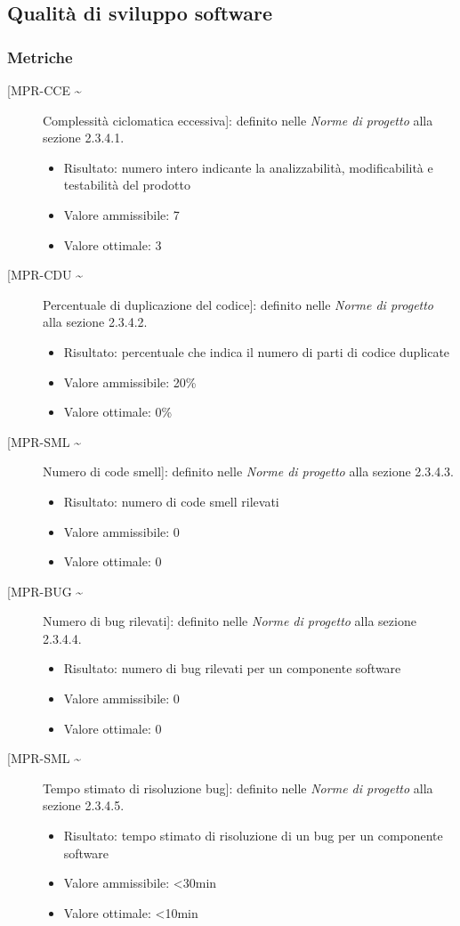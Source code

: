 \documentclass[../piano-di-qualifica.tex]{subfiles}
\begin{document}
\subsection{Qualità di sviluppo software}


\subsubsection{Metriche}%
\label{subsec:metriche_doc}

\begin{description}
  \item [[MPR-CCE \textasciitilde] Complessità ciclomatica eccessiva]: definito nelle \textit{Norme di progetto} alla sezione 2.3.4.1.
        \begin{itemize} \item Risultato: numero intero indicante la analizzabilità, modificabilità e testabilità del prodotto \item Valore ammissibile: \leq{}  7  \item Valore ottimale: \leq{}  3 \end{itemize}
  \item [[MPR-CDU \textasciitilde] Percentuale di duplicazione del codice]: definito nelle \textit{Norme di progetto} alla sezione 2.3.4.2.
        \begin{itemize} \item Risultato: percentuale che indica il numero di parti di codice duplicate \item Valore ammissibile: 20\% \item Valore ottimale: 0\% \end{itemize}
  \item [[MPR-SML \textasciitilde] Numero di code smell]: definito nelle \textit{Norme di progetto} alla sezione 2.3.4.3.
        \begin{itemize} \item Risultato: numero di code smell rilevati \item Valore ammissibile: 0 \item Valore ottimale: 0 \end{itemize}
  \item [[MPR-BUG \textasciitilde] Numero di bug rilevati]: definito nelle \textit{Norme di progetto} alla sezione 2.3.4.4.
        \begin{itemize} \item Risultato: numero di bug rilevati per un componente software \item Valore ammissibile: 0 \item Valore ottimale: 0 \end{itemize}
  \item [[MPR-SML \textasciitilde] Tempo stimato di risoluzione bug]: definito nelle \textit{Norme di progetto} alla sezione 2.3.4.5.
        \begin{itemize} \item Risultato: tempo stimato di risoluzione di un bug per un componente software \item Valore ammissibile: <30min \item Valore ottimale: <10min \end{itemize}
\end{description}
\end{document}
